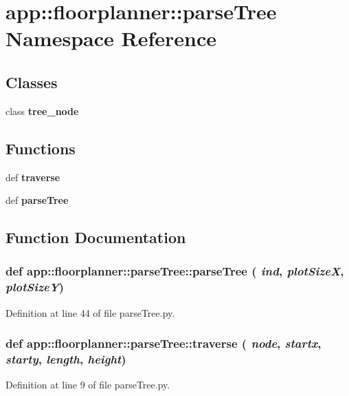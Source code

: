 \section{app::floorplanner::parseTree Namespace Reference}
\label{namespaceapp_1_1floorplanner_1_1parseTree}


\subsection*{Classes}
\begin{CompactItemize}
\item 
class {\bf tree\_\-node}
\end{CompactItemize}
\subsection*{Functions}
\begin{CompactItemize}
\item 
def {\bf traverse}
\item 
def {\bf parseTree}
\end{CompactItemize}


\subsection{Function Documentation}
\subsubsection{\setlength{\rightskip}{0pt plus 5cm}def app::floorplanner::parseTree::parseTree ( {\em ind},  {\em plotSizeX},  {\em plotSizeY})}\label{namespaceapp_1_1floorplanner_1_1parseTree_84dac6f161ec5ff6a651af70f549d8ce}




Definition at line 44 of file parseTree.py.
\subsubsection{\setlength{\rightskip}{0pt plus 5cm}def app::floorplanner::parseTree::traverse ( {\em node},  {\em startx},  {\em starty},  {\em length},  {\em height})}\label{namespaceapp_1_1floorplanner_1_1parseTree_a65a233e725f557bd223f2cc06aaf64b}




Definition at line 9 of file parseTree.py.